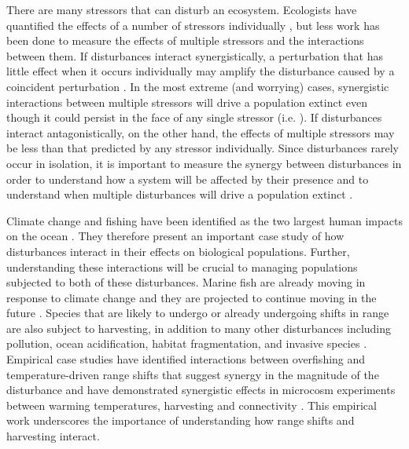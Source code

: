 \documentclass[12pt,english]{article}
\begin{document}
\begin{spacing}{1.9}
\begin{flushleft}
There are many stressors that can disturb an ecosystem. Ecologists have quantified the effects of a number of stressors individually \citep{Wilcoveetal1998, Crainetal2008, DarlingCote2008}, but less work has been done to measure the effects of multiple stressors and the interactions between them.  If disturbances interact synergistically, a perturbation that has little effect when it occurs individually may amplify the disturbance caused by a coincident perturbation \citep{Crainetal2008, DarlingCote2008,Nyeetal2013,Gurevitchetal2000}.   In the most extreme (and worrying) cases, synergistic interactions between multiple stressors will drive a population extinct even though it could persist in the face of any single stressor (i.e. \citet{Pelletieretal2006}).  If disturbances interact antagonistically, on the other hand, the effects of multiple stressors may be less than that predicted by any stressor individually.  Since disturbances rarely occur in isolation, it is important to measure the synergy between  disturbances in order to understand how a system will be affected by their presence and to understand when multiple disturbances will drive a population extinct  \citep{DoakMorris2010, Fordhametal2013, Foltetal1999}.


Climate change and fishing have been identified as the two largest human impacts on the ocean \citep{Halpernetal2008}.  They therefore present an important case study of how disturbances interact in their effects on biological populations.  Further, understanding these interactions will be crucial to managing populations subjected to both of these disturbances.  Marine fish are already moving in response to climate change \citep{Perryetal2005, HiddinkHoftstede2008, Rijnsdorpetal2009, Dulvyetal2008, Simpsonetal2011} and they are projected to continue moving in the future \citep{Kelletal2005, Mackenzieetal2007}.  Species that are likely to undergo or already undergoing shifts in range are also subject to harvesting, in addition to many other disturbances including pollution, ocean acidification, habitat fragmentation, and invasive species \citep{Wilcoveetal1998, Salaetal2000, MEA2005, Pinskyetal2013, Barryetal1995, Nyeetal2009}.  Empirical case studies have identified interactions between overfishing and temperature-driven range shifts that suggest synergy in the magnitude of the disturbance \citep{Lingetal2009} and have demonstrated synergistic effects in microcosm experiments between warming temperatures, harvesting and connectivity \citep{Moraetal2007}. This empirical work underscores the importance of understanding how range shifts and harvesting interact.


\end{flushleft}
\end{spacing}
\end{document}
